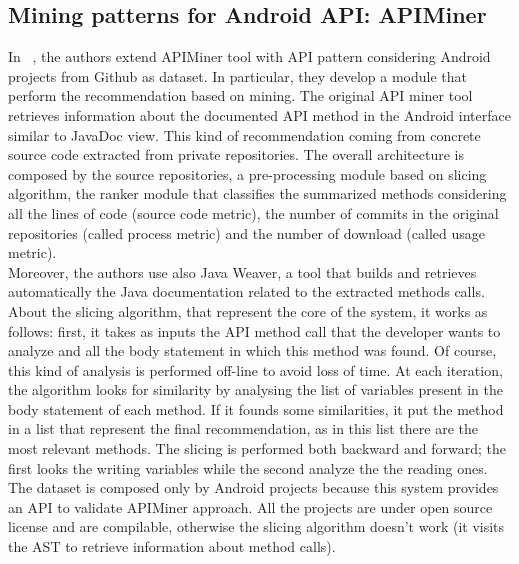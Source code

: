 \subsection{Mining patterns for Android  API: APIMiner}
In  ~\cite{borges_mining_2015}, the authors extend APIMiner tool with API pattern considering Android projects from Github as dataset. In particular, they develop a module that perform the recommendation based on mining. The original API miner tool~\cite{montandon_documenting_2013}  retrieves information about the documented API method in the Android interface similar to JavaDoc view. This kind of recommendation coming from  concrete source code extracted from private repositories. The overall  architecture is composed by the source repositories, a pre-processing module based on slicing algorithm, the ranker module that classifies the summarized methods  considering all the lines of  code (source code metric), the number of commits in the original repositories (called process metric) and the number of download (called usage metric). \\
Moreover, the authors use also Java Weaver, a tool that builds and retrieves automatically the Java documentation related to the extracted methods calls. About the slicing algorithm, that represent the core of the system, it works as follows: first, it takes as inputs the API method call that the developer wants to analyze and all the body statement in which this method was found. Of course, this kind of analysis is performed off-line to avoid loss of time. At each iteration, the algorithm looks for similarity by analysing the list of variables present in the body statement of each method. If it founds some similarities, it put the method in a list that represent the final recommendation, as in this list there are the most relevant methods. The slicing is performed both backward and forward; the first looks the writing variables while the second analyze the the reading ones. The dataset is composed only by Android projects because this system provides an API to validate APIMiner approach. All the projects are under open source license and are compilable, otherwise the slicing algorithm doesn't work (it visits the AST to retrieve information about method calls). \\
